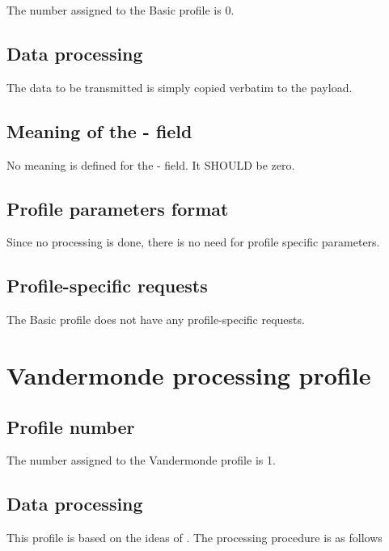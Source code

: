 \documentclass{rfc}
\begin{document}
The number assigned to the Basic profile is 0.

\section{Data processing}
\label{sect:0.0.0;transport_layer}

The data to be transmitted is simply copied verbatim to the payload. 

\section{Meaning of the \marker- field}
\label{sect:0.0.3;transport_layer}

No meaning is defined for the \marker- field.  It SHOULD be zero.

\section{Profile parameters format}
\label{sect:0.0.1;transport_layer}

Since no processing is done, there is no need for profile specific
parameters.

\section{Profile-specific requests}
\label{sect:0.0.2;transport_layer}

The Basic profile does not have any profile-specific requests.


\chapter{Vandermonde processing profile}
\label{subsub:0.1.1;driver}

\section{Profile number}
\label{sub:0.1.1.0;transport_layer}

The number assigned to the Vandermonde profile is 1.

\section{Data processing}
\label{subsub:0.1.1.0;driver}

This profile is based on the ideas of
\cite{bernardini08:dcc08}. The processing procedure is as follows
\end{document}
